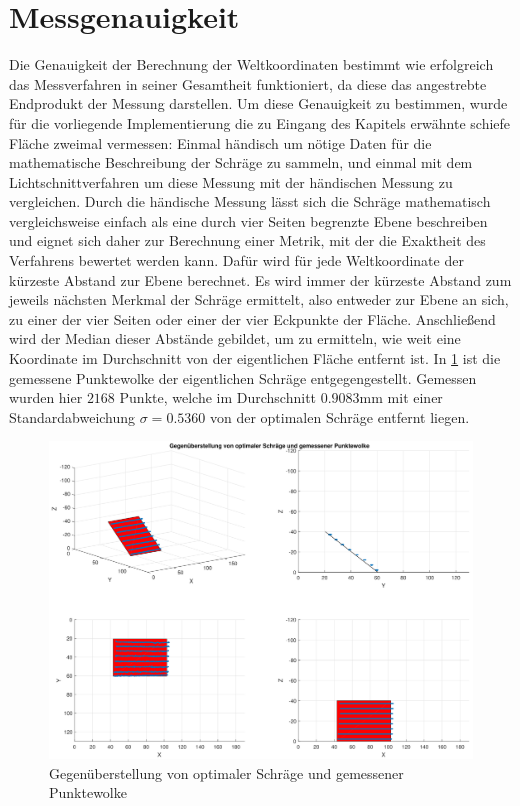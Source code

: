 \section{Messgenauigkeit}
Die Genauigkeit der Berechnung der Weltkoordinaten bestimmt wie erfolgreich das Messverfahren in seiner Gesamtheit funktioniert, da diese das angestrebte Endprodukt der Messung darstellen. Um diese Genauigkeit zu bestimmen, wurde für die vorliegende Implementierung die zu Eingang des Kapitels erwähnte schiefe Fläche zweimal vermessen: Einmal händisch um nötige Daten für die mathematische Beschreibung der Schräge zu sammeln, und einmal mit dem Lichtschnittverfahren um diese Messung mit der händischen Messung zu vergleichen. Durch die händische Messung lässt sich die Schräge mathematisch vergleichsweise einfach als eine durch vier Seiten begrenzte Ebene beschreiben und eignet sich daher zur Berechnung einer Metrik, mit der die Exaktheit des Verfahrens bewertet werden kann. Dafür wird für jede Weltkoordinate der kürzeste Abstand zur Ebene berechnet. Es wird immer der kürzeste Abstand zum jeweils nächsten Merkmal der Schräge ermittelt, also entweder zur Ebene an sich, zu einer der vier Seiten oder einer der vier Eckpunkte der Fläche. Anschließend wird der Median dieser Abstände gebildet, um zu ermitteln, wie weit eine Koordinate im Durchschnitt von der eigentlichen Fläche entfernt ist. In \ref{fig:MessungSlope} ist die gemessene Punktewolke der eigentlichen Schräge entgegengestellt. Gemessen wurden hier \(2168\) Punkte, welche im Durchschnitt \(0.9083\)mm mit einer Standardabweichung \(\sigma = 0.5360\) von  der optimalen Schräge entfernt liegen. \bigbreak

\begin{figure}
\centering \includegraphics[width=\textwidth]{images/Messung.pdf}
\caption[Gegenüberstellung von optimaler Schräge und gemessener Punktewolke]{Gegenüberstellung von optimaler Schräge und gemessener Punktewolke}\label{fig:MessungSlope}
\end{figure}


